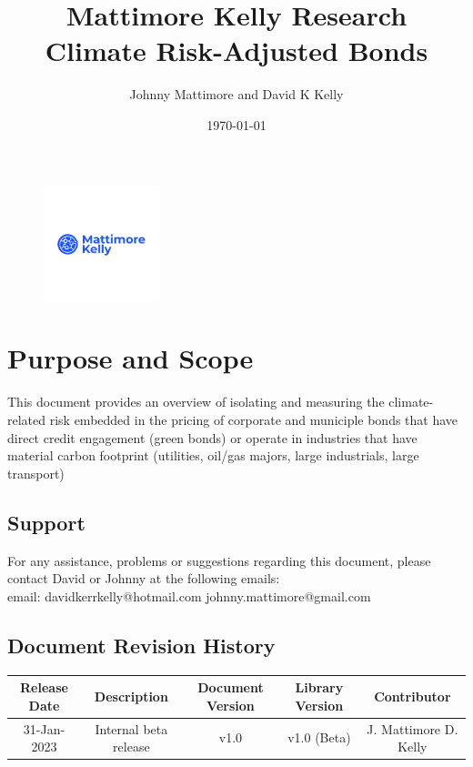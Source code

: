 \documentclass{article}
\begin{document}
\begin{figure}\centering
	\includegraphics[width=0.3\textwidth]{mattimore_kelly_logo.png}
\end{figure}

\title{{\mylargefont Mattimore Kelly Research\vspace*{2\baselineskip} \\
\mylargefont Climate Risk-Adjusted Bonds \vspace*{1\baselineskip} }}


\author{{Johnny Mattimore and David K Kelly}}
\date{\today}

\maketitle
\thispagestyle{empty}
\clearpage
{}
\tableofcontents
\clearpage

\section{Purpose and Scope}
This document provides an overview of isolating and measuring the climate-related risk embedded in the pricing of corporate and municiple bonds that have direct credit engagement (green bonds) or operate in industries that have material carbon footprint (utilities,  oil/gas majors,  large industrials, large transport) \par

\subsection{Support}
For any assistance, problems or suggestions regarding this document,  please contact David or Johnny at the following emails:\\ 
\indent email:   \tabto{2cm} davidkerrkelly@hotmail.com johnny.mattimore@gmail.com

\subsection{Document Revision History}
\begin{table}[ht]
	\centering
	\begin{tabular}{c|c|c|c|c}
		Release Date & Description & Document Version & Library Version & Contributor\\
		\hline
		31-Jan-2023 & Internal beta release & v1.0 & v1.0 (Beta) & J. Mattimore D. Kelly \\
	\end{tabular}
	\label{tab:revision_history}
\end{table}
\end{document}
